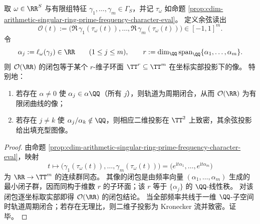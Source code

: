 \begin{corollary}\label{cor:cdim-arithmetic-singular-ring-observable-closure-dichotomy}
取 \(\omega\in\RR^{S}\) 与有限组特征 \(\gamma_1,\dots,\gamma_m\in\Gamma_S\)，并记 \(\tau_{\omega}\) 如命题 \ref{prop:cdim-arithmetic-singular-ring-prime-frequency-character-eval}。
定义余弦读出
\[
\mathcal{O}(t):=\bigl(\Re\,\gamma_1(\tau_{\omega}(t)),\dots,\Re\,\gamma_m(\tau_{\omega}(t))\bigr)\in[-1,1]^m.
\]
令
\[
\alpha_j:=\ell_{\omega}(\gamma_j)\in\RR\qquad(1\le j\le m),
\qquad
r:=\dim_{\QQ}\mathrm{span}_{\QQ}\{\alpha_1,\dots,\alpha_m\}.
\]
则 \(\mathcal{O}(\RR)\) 的闭包等于某个 \(r\)-维子环面 \(\TT^{r}\subseteq\TT^{m}\) 在坐标实部投影下的像。
特别地：
\begin{enumerate}
  \item 若存在 \(\alpha\neq 0\) 使 \(\alpha_j\in\alpha\QQ\)（所有 \(j\)），则轨道为周期闭合，从而 \(\mathcal{O}(\RR)\) 为有限闭曲线的像；
  \item 若存在 \(j\neq k\) 使 \(\alpha_j/\alpha_k\notin\QQ\)，则相应二维投影在 \(\TT^2\) 上致密，其余弦投影给出填充型图像。
\end{enumerate}
\end{corollary}
\begin{proof}
由命题 \ref{prop:cdim-arithmetic-singular-ring-prime-frequency-character-eval}，映射
\[
t\longmapsto \bigl(\gamma_1(\tau_{\omega}(t)),\dots,\gamma_m(\tau_{\omega}(t))\bigr)
=\bigl(e^{\mathrm{i}t\alpha_1},\dots,e^{\mathrm{i}t\alpha_m}\bigr)
\]
为 \(\RR\to\TT^{m}\) 的连续群同态。
其像的闭包是由频率向量 \((\alpha_1,\dots,\alpha_m)\) 生成的最小闭子群，因而同构于维数 \(r\) 的子环面；该 \(r\) 等于 \(\{\alpha_j\}\) 的 \(\QQ\)-线性秩。
对该闭包逐坐标取实部即得 \(\mathcal{O}(\RR)\) 的闭包结论。
当全部频率共线于一维 \(\QQ\)-子空间时轨道周期闭合；若存在无理比，则二维子投影为 Kronecker 流并致密。证毕。
\end{proof}

